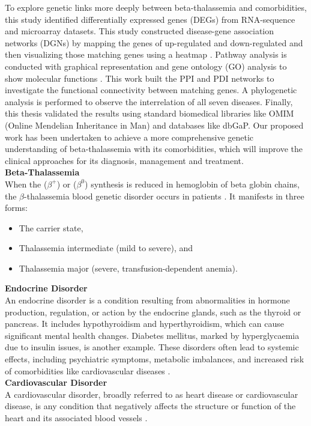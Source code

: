 To explore genetic links more deeply between beta-thalassemia and comorbidities, this study identified differentially expressed genes (DEGs) from RNA-sequence and microarray datasets. This study constructed disease-gene association networks (DGNs) by mapping the genes of up-regulated and down-regulated and then visualizing those matching genes using a heatmap \cite{b3}. Pathway analysis is conducted with graphical representation and gene ontology (GO) analysis to show molecular functions \cite{b3}. This work built the PPI and PDI networks to investigate the functional connectivity between matching genes. A phylogenetic analysis is performed to observe the interrelation of all seven diseases. Finally, this thesis validated the results using standard biomedical libraries like OMIM (Online Mendelian Inheritance in Man) and databases like dbGaP. Our proposed work has been undertaken to achieve a more comprehensive genetic understanding of beta-thalassemia with its comorbidities, which will improve the clinical approaches for its diagnosis, management and treatment. \\

\textbf{Beta-Thalassemia} \\
When the ($\beta^{+}$) or ($\beta^{0}$) synthesis is reduced in hemoglobin of beta globin chains, the $\beta$-thalassemia blood genetic disorder occurs in patients \cite{b4}. It manifests in three forms:
\begin{itemize}
    \item The carrier state,
    \item Thalassemia intermediate (mild to severe), and
    \item Thalassemia major (severe, transfusion-dependent anemia).
\end{itemize} 
\vspace{5mm}
\textbf{Endocrine Disorder} \\
An endocrine disorder is a condition resulting from abnormalities in hormone production, regulation, or action by the endocrine glands, such as the thyroid or pancreas. It includes hypothyroidism and hyperthyroidism, which can cause significant mental health changes. Diabetes mellitus, marked by hyperglycaemia due to insulin issues, is another example. These disorders often lead to systemic effects, including psychiatric symptoms, metabolic imbalances, and increased risk of comorbidities like cardiovascular diseases \cite{b5}. \\

\textbf{Cardiovascular Disorder} \\
A cardiovascular disorder, broadly referred to as heart disease or cardiovascular disease, is any condition that negatively affects the structure or function of the heart and its associated blood vessels \cite{b6}. \\


